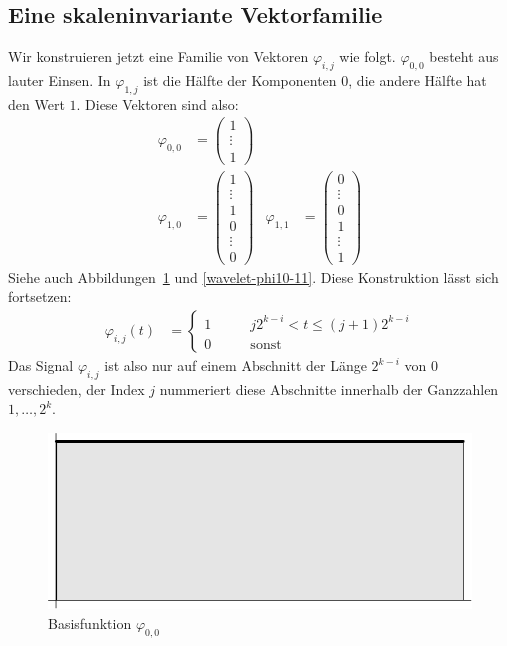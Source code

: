 \subsection{Eine skaleninvariante Vektorfamilie}
Wir konstruieren jetzt eine Familie von Vektoren $\varphi_{i,j}$
wie folgt. $\varphi_{0,0}$ besteht aus lauter Einsen. In $\varphi_{1,j}$
ist die Hälfte der Komponenten $0$, die andere Hälfte hat den
Wert $1$. 
Diese Vektoren sind also:
\begin{align*}
\varphi_{0,0}&=\begin{pmatrix}1\\\vdots\\1\end{pmatrix}
\\
\varphi_{1,0}&=\begin{pmatrix}1\\\vdots\\1\\0\\\vdots\\0\end{pmatrix}&
\varphi_{1,1}&=\begin{pmatrix}0\\\vdots\\0\\1\\\vdots\\1\end{pmatrix}
\end{align*}
Siehe auch Abbildungen~\ref{wavelet-phi00} und \ref{wavelet-phi10-11}.
Diese Konstruktion lässt sich fortsetzen:
\begin{align*}
\varphi_{i,j}(t)&=\begin{cases}
1&\qquad j2^{k-i}<t\le (j+1)2^{k-i}\\
0&\qquad\text{sonst}
\end{cases}
\end{align*}
Das Signal $\varphi_{i,j}$ ist also nur auf einem Abschnitt der
Länge $2^{k-i}$ von $0$ verschieden, der Index $j$ nummeriert
diese Abschnitte innerhalb der Ganzzahlen $1,\dots,2^k$.
\begin{figure}
\begin{center}
\includegraphics[width=0.45\hsize]{images/w-1}
\end{center}
\caption{Basisfunktion $\varphi_{0,0}$\label{wavelet-phi00}}
\end{figure}
